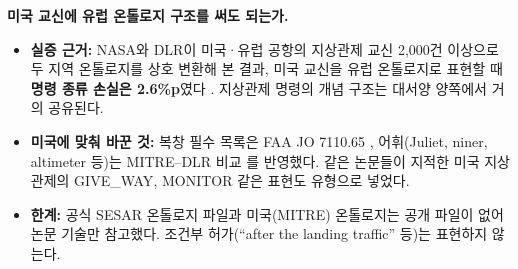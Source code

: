 \documentclass[10pt,a4paper]{article}
\newcommand{\cmd}[1]{\textsf{\small #1}}
\begin{document}
\begin{addbox}
\textbf{미국 교신에 유럽 온톨로지 구조를 써도 되는가.}
\begin{itemize}[leftmargin=12pt]
\item \textbf{실증 근거:} NASA와 DLR이 미국·유럽 공항의 지상관제 교신 2,000건 이상으로 두 지역 온톨로지를 상호 변환해 본 결과, 미국 교신을 유럽 온톨로지로 표현할 때 \textbf{명령 종류 손실은 2.6\%p}였다 \cite{helmke2025loss}. 지상관제 명령의 개념 구조는 대서양 양쪽에서 거의 공유된다.
\item \textbf{미국에 맞춰 바꾼 것:} 복창 필수 목록은 FAA JO 7110.65 \cite{faa7110}, 어휘(Juliet, niner, altimeter 등)는 MITRE--DLR 비교 \cite{chen2023}를 반영했다. 같은 논문들이 지적한 미국 지상관제의 \cmd{GIVE\_WAY}, \cmd{MONITOR} 같은 표현도 유형으로 넣었다.
\item \textbf{한계:} 공식 SESAR 온톨로지 파일과 미국(MITRE) 온톨로지는 공개 파일이 없어 논문 기술만 참고했다. 조건부 허가(``after the landing traffic'' 등)는 표현하지 않는다.
\end{itemize}
\end{addbox}
\end{document}
